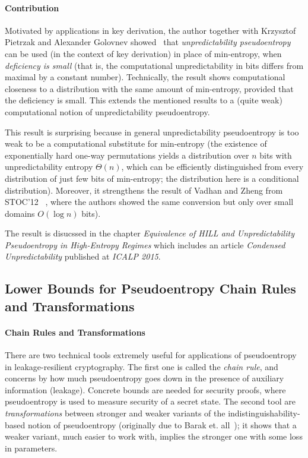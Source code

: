 \documentclass[12pt]{report}
\begin{document}
\paragraph{Contribution}
Motivated by applications in key derivation, the author together with Krzysztof Pietrzak and Alexander Golovnev showed~\cite{DBLP:conf/icalp/SkorskiGP15}
 that \emph{unpredictability pseudoentropy} can be used (in the context of key derivation) in place of min-entropy, when \emph{deficiency is small} (that is, the computational unpredictability in bits differs from maximal by a constant number). Technically, the result shows computational closeness to a distribution with the same amount of min-entropy, provided that the deficiency is small.
This extends the mentioned results to a (quite weak) computational notion of unpredictability pseudoentropy. 


This result is surprising because in general unpredictability pseudoentropy 
is too weak to be a computational substitute for min-entropy
(the existence of exponentially hard one-way permutations yields a distribution over $n$ bits with unpredictability entropy $\Theta(n)$, which can be efficiently distinguished from every distribution of just few bits of min-entropy; the distribution here is a conditional distribution). 
Moreover, it strengthens the result
of Vadhan and Zheng from STOC'12~ 
\cite{DBLP:conf/stoc/VadhanZ12}, where the authors showed the same conversion but only over small domains $O(\log n)$ bits).

The result is disucssed in the chapter \emph{Equivalence of HILL and Unpredictability Pseudoentropy in High-Entropy Regimes}
which includes an article \emph{Condensed Unpredictability} published at  \emph{ICALP 2015}.

\subsection{Lower Bounds for Pseudoentropy Chain Rules and Transformations}

\paragraph{Chain Rules and Transformations}
There are two technical tools extremely useful for applications of pseudoentropy in leakage-resilient cryptography.
The first one is called the \emph{chain rule}, and concerns by how much pseudoentropy goes down in the presence of auxiliary information (leakage). Concrete bounds are needed for security proofs, where pseudoentropy is used to measure security of a secret state. The second tool are \emph{transformations} between stronger and weaker variants of the indistinguishability-based notion of pseudoentropy (originally due to Barak et. all~\cite{DBLP:conf/random/BarakSW03}); it shows that
a weaker variant, much easier to work with, implies the stronger one with some loss in parameters.
\end{document}
